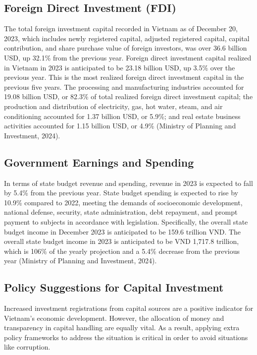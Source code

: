 \documentclass{article}
\begin{document}
\subsection*{Foreign Direct Investment (FDI)}
The total foreign investment capital recorded in Vietnam as of December 20, 2023, which includes newly registered capital, adjusted registered capital, capital contribution, and share purchase value of foreign investors, was over 36.6 billion USD, up 32.1\% from the previous year.  
Foreign direct investment capital realized in Vietnam in 2023 is anticipated to be 23.18 billion USD, up 3.5\% over the previous year.  
This is the most realized foreign direct investment capital in the previous five years.  
The processing and manufacturing industries accounted for 19.08 billion USD, or 82.3\% of total realized foreign direct investment capital; the production and distribution of electricity, gas, hot water, steam, and air conditioning accounted for 1.37 billion USD, or 5.9\%; and real estate business activities accounted for 1.15 billion USD, or 4.9\% (Ministry of Planning and Investment, 2024).

\subsection*{Government Earnings and Spending}
In terms of state budget revenue and spending, revenue in 2023 is expected to fall by 5.4\% from the previous year.  
State budget spending is expected to rise by 10.9\% compared to 2022, meeting the demands of socioeconomic development, national defense, security, state administration, debt repayment, and prompt payment to subjects in accordance with legislation.  
Specifically, the overall state budget income in December 2023 is anticipated to be 159.6 trillion VND.  
The overall state budget income in 2023 is anticipated to be VND 1,717.8 trillion, which is 106\% of the yearly projection and a 5.4\% decrease from the previous year (Ministry of Planning and Investment, 2024).

\subsection*{Policy Suggestions for Capital Investment}
Increased investment registrations from capital sources are a positive indicator for Vietnam's economic development.  
However, the allocation of money and transparency in capital handling are equally vital.  
As a result, applying extra policy frameworks to address the situation is critical in order to avoid situations like corruption.
\end{document}
